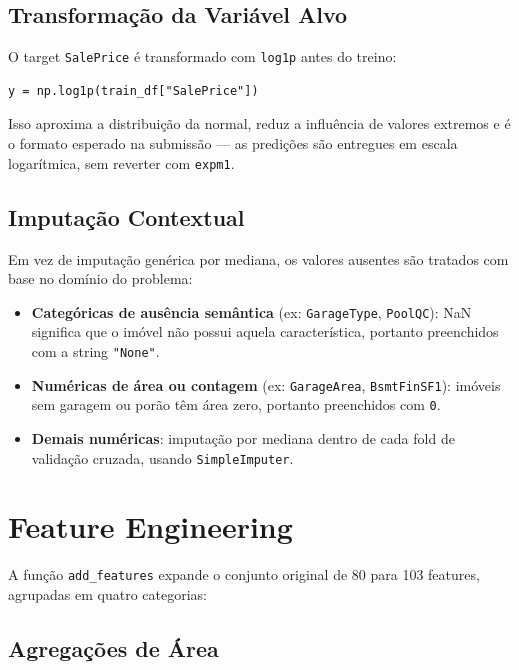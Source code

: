 \documentclass[11pt]{article}
\begin{document}
\subsection{Transformação da Variável Alvo}
\label{sec:org025655d}

O target \texttt{SalePrice} é transformado com \texttt{log1p} antes do treino:

\begin{verbatim}
y = np.log1p(train_df["SalePrice"])
\end{verbatim}

Isso aproxima a distribuição da normal, reduz a influência de valores
extremos e é o formato esperado na submissão — as predições são
entregues em escala logarítmica, sem reverter com \texttt{expm1}.
\subsection{Imputação Contextual}
\label{sec:org88a79f4}

Em vez de imputação genérica por mediana, os valores ausentes são
tratados com base no domínio do problema:

\begin{itemize}
\item \textbf{Categóricas de ausência semântica} (ex: \texttt{GarageType}, \texttt{PoolQC}): NaN
significa que o imóvel não possui aquela característica, portanto
preenchidos com a string \texttt{"None"}.

\item \textbf{Numéricas de área ou contagem} (ex: \texttt{GarageArea}, \texttt{BsmtFinSF1}):
imóveis sem garagem ou porão têm área zero, portanto preenchidos
com \texttt{0}.

\item \textbf{Demais numéricas}: imputação por mediana dentro de cada fold de
validação cruzada, usando \texttt{SimpleImputer}.
\end{itemize}
\section{Feature Engineering}
\label{sec:org287a936}

A função \texttt{add\_features} expande o conjunto original de 80 para 103
features, agrupadas em quatro categorias:
\subsection{Agregações de Área}
\label{sec:org4e94e8e}
\end{document}
